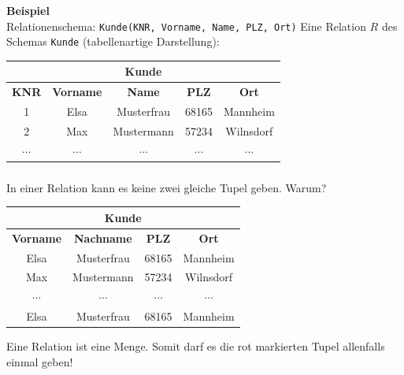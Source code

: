 \begin{frame}\frametitle{\insertsection}
\framesubtitle{\insertsubsection}
\textbf{Beispiel}\\
\abs
Relationenschema: \texttt{Kunde(KNR, Vorname, Name, PLZ, Ort)}
\abs
Eine Relation $R$ des Schemas \texttt{Kunde} (tabellenartige Darstellung):
\begin{center}
	\begin{tabular}{|c|c|c|c|c|}\hline
		\multicolumn{5}{|c|}{\small \textbf{Kunde}}\\\hline\hline
		\small \textbf{KNR} & \small \textbf{Vorname} & \small \textbf{Name} & \small \textbf{PLZ} & \small \textbf{Ort} \\\hline
		\small 1 &\small Elsa &\small Musterfrau &\small 68165 &\small Mannheim \\\hline
		\small 2 & \small Max &\small  Mustermann & \small 57234 &\small Wilnsdorf \\\hline
		$\cdots$ & $\cdots$ & $\cdots$ & $\cdots$ & $\cdots$ \\\hline
	\end{tabular}
\end{center}
\end{frame}

\begin{frame}\frametitle{\insertsection}
\framesubtitle{\insertsubsection}
In einer Relation kann es keine zwei gleiche Tupel geben. Warum?
\onslide\pause
\begin{center}
	\begin{tabular}{|c|c|c|c|}\hline
		\multicolumn{4}{|c|}{\small \textbf{Kunde}}\\\hline\hline
		\small \textbf{Vorname} & \small \textbf{Nachname} & \small \textbf{PLZ} & \small \textbf{Ort} \\\hline
		\rowcolor{Red}
		\small Elsa &\small Musterfrau &\small 68165 &\small Mannheim \\\hline
		\small Max &\small  Mustermann & \small 57234 &\small Wilnsdorf \\\hline
		$\cdots$ & $\cdots$ & $\cdots$ & $\cdots$ \\\hline
		\rowcolor{Red}
		\small Elsa &\small Musterfrau &\small 68165 &\small Mannheim \\\hline
	\end{tabular}
\end{center}
\abs 
\alert{Eine Relation ist eine Menge. Somit darf es die rot markierten Tupel allenfalls einmal geben!}
\end{frame}

